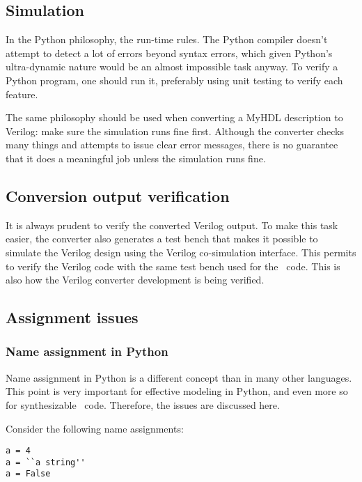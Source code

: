 \subsection{Simulation\label{conv-meth-sim}}

In the Python philosophy, the run-time rules. The Python compiler
doesn't attempt to detect a lot of errors beyond syntax errors, which
given Python's ultra-dynamic nature would be an almost impossible task
anyway. To verify a Python program, one should run it, preferably
using unit testing to verify each feature.

The same philosophy should be used when converting a MyHDL description
to Verilog: make sure the simulation runs fine first. Although the
converter checks many things and attempts to issue clear error
messages, there is no guarantee that it does a meaningful job unless
the simulation runs fine.

\subsection{Conversion output verification\label{conv-meth-conv}}
It is always prudent to verify the converted Verilog output.
To make this task easier, the converter also generates a
test bench that makes it possible to simulate the Verilog
design using the Verilog co-simulation interface. This 
permits to verify the Verilog code with the same test
bench used for the \myhdl\ code. This is also how
the Verilog converter development is being verified.

\subsection{Assignment issues\label{conv-meth-assign}}

\subsubsection{Name assignment in Python\label{conv-meth-assign-python}}

Name assignment in Python is a different concept than in
many other languages. This point is very important for
effective modeling in Python, and even more so
for synthesizable \myhdl\ code. Therefore, the issues are
discussed here.

Consider the following name assignments:

\begin{verbatim}
a = 4
a = ``a string''
a = False
\end{verbatim}

